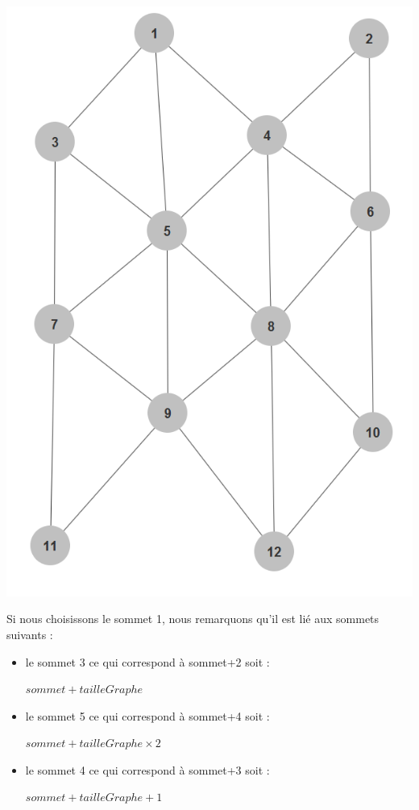 \documentclass{report}
\begin{document}
			\begin{center}
				
					\includegraphics[scale=0.30]{Images/Graphe.png}
			
			\end{center}
			
			Si nous choisissons le sommet 1, nous remarquons qu'il est li\'e aux sommets suivants :
			
			\begin{itemize}
			
			
				\item le sommet 3 ce qui correspond à sommet+2 soit :
				
				
			
				$sommet+tailleGraphe$
				
				\item le sommet 5 ce qui correspond à sommet+4 soit :
				
				
				
				$sommet+tailleGraphe\times2$
				
				\item le sommet 4 ce qui correspond à sommet+3 soit : 
				
				
				
				$sommet+tailleGraphe+1$
				
			\end{itemize}
			
\end{document}
